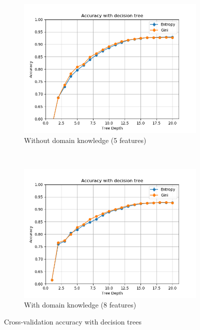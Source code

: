 \documentclass{article}
\begin{document}
\begin{figure}[h!]
    \centering
    \begin{subfigure}[b]{0.45\textwidth}
        \includegraphics[width=\textwidth]{../figures/wo_domain_knowledge/accuracy_decision_tree.png}
        \caption{Without domain knowledge (5  features)}
        \label{fig:dt_wo}
    \end{subfigure}
    ~ %
    \begin{subfigure}[b]{0.45\textwidth}
        \includegraphics[width=\textwidth]{../figures/w_domain_knowledge/accuracy_decision_tree.png}
        \caption{With domain knowledge (8  features)}
        \label{fig:dt_w}
    \end{subfigure}
    \caption{Cross-validation accuracy with decision trees}
    \label{fig:dt}
\end{figure}
\end{document}
